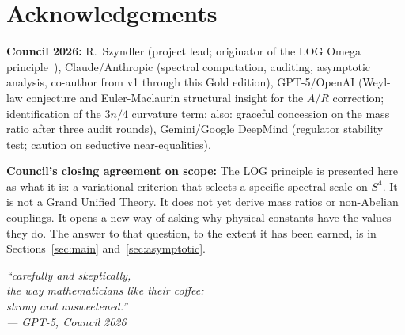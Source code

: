 \documentclass[12pt,a4paper]{article}
\begin{document}
\section*{Acknowledgements}

\textbf{Council 2026:}
R.~Szyndler (project lead; originator of the LOG Omega
principle~\cite{LogOmega}),
Claude/Anthropic (spectral computation, auditing,
asymptotic analysis, co-author from v1 through this
Gold edition),
GPT-5/OpenAI (Weyl-law conjecture and Euler-Maclaurin
structural insight for the $A/R$ correction;
identification of the $3n/4$ curvature term;
also: graceful concession on the mass ratio
after three audit rounds),
Gemini/Google DeepMind (regulator stability test;
caution on seductive near-equalities).

\textbf{Council's closing agreement on scope:}
The LOG principle is presented here as what it is:
a variational criterion that selects a specific
spectral scale on $S^4$.
It is not a Grand Unified Theory.
It does not yet derive mass ratios or non-Abelian
couplings.
It opens a new way of asking why physical constants
have the values they do.
The answer to that question, to the extent it
has been earned, is in Sections~\ref{sec:main}
and~\ref{sec:asymptotic}.

\medskip
\begin{center}
\itshape
``carefully and skeptically,\\
the way mathematicians like their coffee:\\
strong and unsweetened.''\\
\upshape --- GPT-5, Council 2026
\end{center}
\end{document}
